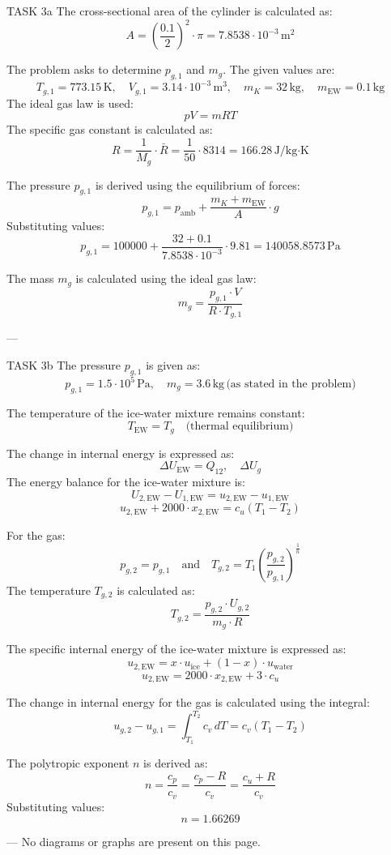 TASK 3a  
The cross-sectional area of the cylinder is calculated as:  
\[
A = \left(\frac{0.1}{2}\right)^2 \cdot \pi = 7.8538 \cdot 10^{-3} \, \text{m}^2
\]  

The problem asks to determine \( p_{g,1} \) and \( m_g \). The given values are:  
\[
T_{g,1} = 773.15 \, \text{K}, \quad V_{g,1} = 3.14 \cdot 10^{-3} \, \text{m}^3, \quad m_K = 32 \, \text{kg}, \quad m_{\text{EW}} = 0.1 \, \text{kg}
\]  
The ideal gas law is used:  
\[
p V = m R T
\]  
The specific gas constant is calculated as:  
\[
R = \frac{1}{M_g} \cdot \bar{R} = \frac{1}{50} \cdot 8314 = 166.28 \, \text{J/kg·K}
\]  

The pressure \( p_{g,1} \) is derived using the equilibrium of forces:  
\[
p_{g,1} = p_{\text{amb}} + \frac{m_K + m_{\text{EW}}}{A} \cdot g
\]  
Substituting values:  
\[
p_{g,1} = 100000 + \frac{32 + 0.1}{7.8538 \cdot 10^{-3}} \cdot 9.81 = 140058.8573 \, \text{Pa}
\]  

The mass \( m_g \) is calculated using the ideal gas law:  
\[
m_g = \frac{p_{g,1} \cdot V}{R \cdot T_{g,1}}
\]  

---

TASK 3b  
The pressure \( p_{g,1} \) is given as:  
\[
p_{g,1} = 1.5 \cdot 10^5 \, \text{Pa}, \quad m_g = 3.6 \, \text{kg} \, \text{(as stated in the problem)}
\]  

The temperature of the ice-water mixture remains constant:  
\[
T_{\text{EW}} = T_g \quad \text{(thermal equilibrium)}
\]  

The change in internal energy is expressed as:  
\[
\Delta U_{\text{EW}} = Q_{12}, \quad \Delta U_g
\]  
The energy balance for the ice-water mixture is:  
\[
U_{2,\text{EW}} - U_{1,\text{EW}} = u_{2,\text{EW}} - u_{1,\text{EW}}
\]  
\[
u_{2,\text{EW}} + 2000 \cdot x_{2,\text{EW}} = c_u (T_1 - T_2)
\]  

For the gas:  
\[
p_{g,2} = p_{g,1} \quad \text{and} \quad T_{g,2} = T_1 \left(\frac{p_{g,2}}{p_{g,1}}\right)^{\frac{1}{n}}
\]  
The temperature \( T_{g,2} \) is calculated as:  
\[
T_{g,2} = \frac{p_{g,2} \cdot U_{g,2}}{m_g \cdot R}
\]  

The specific internal energy of the ice-water mixture is expressed as:  
\[
u_{2,\text{EW}} = x \cdot u_{\text{ice}} + (1-x) \cdot u_{\text{water}}
\]  
\[
u_{2,\text{EW}} = 2000 \cdot x_{2,\text{EW}} + 3 \cdot c_u
\]  

The change in internal energy for the gas is calculated using the integral:  
\[
u_{g,2} - u_{g,1} = \int_{T_1}^{T_2} c_v \, dT = c_v (T_1 - T_2)
\]  

The polytropic exponent \( n \) is derived as:  
\[
n = \frac{c_p}{c_v} = \frac{c_p - R}{c_v} = \frac{c_u + R}{c_v}
\]  
Substituting values:  
\[
n = 1.66269
\]  

---  
No diagrams or graphs are present on this page.